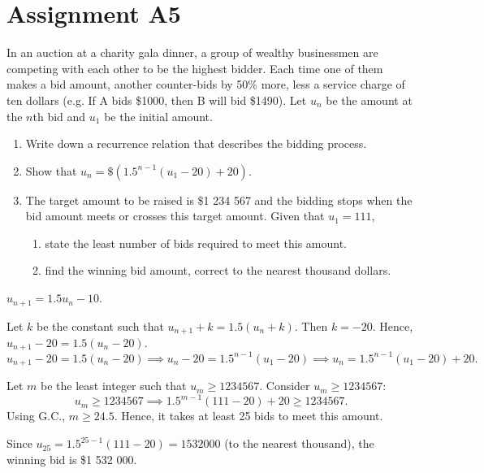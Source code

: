 \section{Assignment A5}

\begin{problem}
    In an auction at a charity gala dinner, a group of wealthy businessmen are competing with each other to be the highest bidder. Each time one of them makes a bid amount, another counter-bids by 50\% more, less a service charge of ten dollars (e.g. If A bids \$1000, then B will bid \$1490). Let $u_n$ be the amount at the $n$th bid and $u_1$ be the initial amount.

    \begin{enumerate}
        \item Write down a recurrence relation that describes the bidding process.
        \item Show that $u_n = \$(1.5^{n-1} (u_1 - 20) + 20)$.
        \item The target amount to be raised is \$1 234 567 and the bidding stops when the bid amount meets or crosses this target amount. Given that $u_1 = 111$,
        \begin{enumerate}
            \item state the least number of bids required to meet this amount.
            \item find the winning bid amount, correct to the nearest thousand dollars.
        \end{enumerate}
    \end{enumerate}
\end{problem}
\begin{solution}
    \begin{ppart}
        $u_{n+1} = 1.5u_n - 10$.
    \end{ppart}
    \begin{ppart}
        Let $k$ be the constant such that $u_{n+1} + k = 1.5(u_n + k)$. Then $k = -20$. Hence, $u_{n+1} - 20 = 1.5(u_n - 20)$. \[u_{n+1} - 20 = 1.5(u_n - 20) \implies u_n - 20 = 1.5^{n-1}(u_1 - 20) \implies u_n = 1.5^{n-1}(u_1 - 20) + 20.\]
    \end{ppart}
    \begin{ppart}
        \begin{psubpart}
            Let $m$ be the least integer such that $u_m \geq 1234567$. Consider $u_m \geq 1234567$: \[u_m \geq 1234567 \implies 1.5^{m-1}(111 - 20) + 20 \geq 1234567.\] Using G.C., $m \geq 24.5$. Hence, it takes at least 25 bids to meet this amount.
        \end{psubpart}
        \begin{psubpart}
            Since $u_{25} = 1.5^{25-1}(111 - 20) = 1532000$ (to the nearest thousand), the winning bid is \$1 532 000.
        \end{psubpart}
    \end{ppart}
\end{solution}

